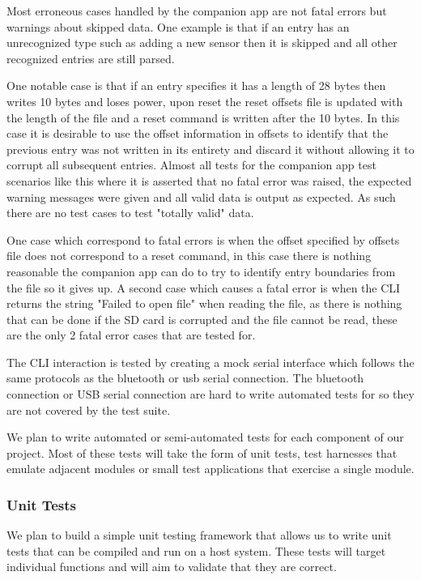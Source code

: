 Most erroneous cases handled by the companion app are not fatal errors but warnings about skipped data. One example is that if an entry has an unrecognized type such as adding a new sensor then it is skipped and all other recognized entries are still parsed.

One notable case is that if an entry specifies it has a length of 28 bytes then
writes 10 bytes and loses power, upon reset the reset offsets file is updated with 
the length of the file and a reset command is written after the 10 bytes.  
In this case it is desirable to use the offset information in offsets to 
identify that the previous entry was not written in its entirety and discard it without allowing it to corrupt all subsequent entries.  Almost all tests for the companion app test scenarios like this where it is asserted that no fatal error was raised, the expected warning messages were given and all valid data is output as expected. As such there are no test cases to test "totally valid" data.

One case which correspond to fatal errors is when the offset specified by offsets file does not correspond to a reset command, in this case there is nothing reasonable the companion app can do to try to identify entry boundaries from the file so it gives up.  A second case which causes a fatal error is when the CLI returns the string "Failed to open file" when reading the file, as there is nothing that can be done if the SD card is corrupted and the file cannot be read, these are the only 2 fatal error cases that are tested for.

The CLI interaction is tested by creating a mock serial interface which follows the same protocols as the bluetooth or usb serial connection.  The bluetooth connection or USB serial connection are hard to write automated tests for so they are not covered by the test suite.

\iffalse

We plan to write automated or semi-automated tests for each component of our
project. Most of these tests will take the form of unit tests, test harnesses
that emulate adjacent modules or small test applications that exercise a single
module.

\subsubsection{Unit Tests}

We plan to build a simple unit testing framework that allows us to write unit
tests that can be compiled and run on a host system. These tests will target
individual functions and will aim to validate that they are correct.

